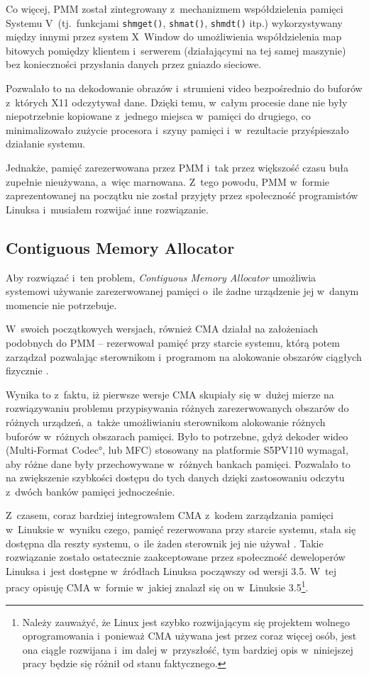 Co więcej, PMM został zintegrowany z~mechanizmem współdzielenia
pamięci Systemu V~(tj.\ funkcjami \lstinline|shmget()|,
\lstinline|shmat()|, \lstinline|shmdt()| itp.) wykorzystywany między
innymi przez system X~Window do umożliwienia współdzielenia map
bitowych pomiędzy klientem i~serwerem (działającymi na tej samej
maszynie) bez konieczności przysłania danych przez gniazdo sieciowe.

Pozwalało to na dekodowanie obrazów i~strumieni video bezpośrednio do
buforów z~których X11 odczytywał dane.  Dzięki temu, w~całym procesie
dane nie były niepotrzebnie kopiowane z~jednego miejsca w~pamięci do
drugiego, co minimalizowało zużycie procesora i~szyny pamięci
i~w~rezultacie przyśpieszało działanie systemu.

Jednakże, pamięć zarezerwowana przez PMM i~tak przez większość czasu
buła zupełnie nieużywana, a~więc marnowana.  Z~tego powodu, PMM
w~formie zaprezentowanej na początku nie został przyjęty przez
społeczność programistów Linuksa i~musiałem rozwijać inne rozwiązanie.

\subsection{Contiguous Memory Allocator}

Aby rozwiązać i~ten problem, {\it Contiguous Memory Allocator}
umożliwia systemowi używanie zarezerwowanej pamięci o~ile żadne
urządzenie jej w~danym momencie nie potrzebuje.

W~swoich początkowych wersjach, również CMA działał na założeniach
podobnych do PMM -- rezerwował pamięć przy starcie systemu, którą
potem zarządzał pozwalając sterownikom i~programom na alokowanie
obszarów ciągłych fizycznie \cite{patch:cma-4}.

Wynika to z~faktu, iż pierwsze wersje CMA skupiały się w~dużej mierze
na rozwiązywaniu problemu przypisywania różnych zarezerwowanych
obszarów do różnych urządzeń, a~także umożliwianiu sterownikom
alokowanie różnych buforów w~różnych obszarach pamięci.  Było to
potrzebne, gdyż dekoder wideo (\ang{Multi-Format Codec}, lub MFC)
stosowany na platformie S5PV110 wymagał, aby różne dane były
przechowywane w~różnych bankach pamięci.  Pozwalało to na zwiększenie
szybkości dostępu do tych danych dzięki zastosowaniu odczytu z~dwóch
banków pamięci jednocześnie.

Z~czasem, coraz bardziej integrowałem CMA z~kodem zarządzania pamięci
w~Linuksie w~wyniku czego, pamięć rezerwowana przy starcie systemu,
stała się dostępna dla reszty systemu, o~ile żaden sterownik jej nie
używał \cite{patch:cma-24}.  Takie rozwiązanie zostało ostatecznie
zaakceptowane przez społeczność deweloperów Linuksa i~jest dostępne
w~źródłach Linuksa począwszy od wersji 3.5.  W~tej pracy opisuję CMA
w~formie w~jakiej znalazł się on w~Linuksie 3.5\footnote{Należy
  zauważyć, że Linux jest szybko rozwijającym się projektem wolnego
  oprogramowania i~ponieważ CMA używana jest przez coraz więcej osób,
  jest ona ciągle rozwijana i~im dalej w~przyszłość, tym bardziej opis
  w~niniejszej pracy będzie się różnił od stanu faktycznego.}.


